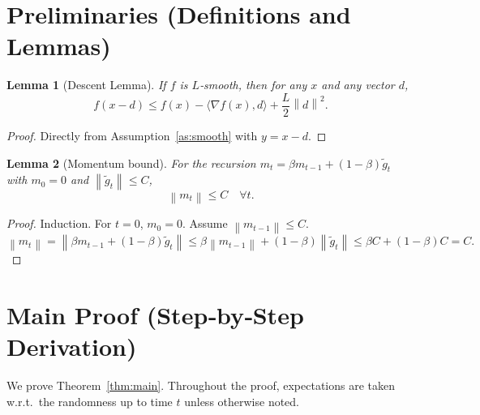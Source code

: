 \documentclass{article}
\newtheorem{lemma}{Lemma}
\newcommand{\norm}[1]{\left\lVert #1 \right\rVert}
\begin{document}
\newpage

\section*{Preliminaries (Definitions and Lemmas)}
\begin{lemma}[Descent Lemma]\label{lem:descent}
If $f$ is $L$‑smooth, then for any $x$ and any vector $d$,
\[
f(x-d)\le f(x)-\langle\nabla f(x),d\rangle+\frac{L}{2}\norm{d}^{2}.
\]
\end{lemma}
\begin{proof}
Directly from Assumption~\ref{as:smooth} with $y=x-d$.
\end{proof}

\begin{lemma}[Momentum bound]\label{lem:momentum}
For the recursion $m_t=\beta m_{t-1}+(1-\beta)\tilde g_t$ with $m_0=0$ and $\norm{\tilde g_t}\le C$,
\[
\norm{m_t}\le C\quad\forall t .
\]
\end{lemma}
\begin{proof}
Induction. For $t=0$, $m_0=0$. Assume $\norm{m_{t-1}}\le C$.
\[
\norm{m_t}= \norm{\beta m_{t-1}+(1-\beta)\tilde g_t}
          \le \beta\norm{m_{t-1}}+(1-\beta)\norm{\tilde g_t}
          \le \beta C+(1-\beta)C=C .
\]
\end{proof}

\section*{Main Proof (Step‑by‑Step Derivation)}
We prove Theorem~\ref{thm:main}. Throughout the proof, expectations are taken w.r.t.\ the randomness up to time $t$ unless otherwise noted.
\end{document}
